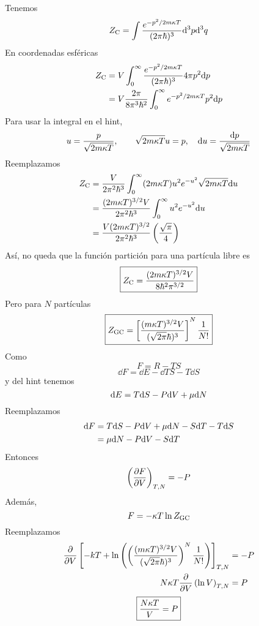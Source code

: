 \begin{sol}
	Tenemos
	\begin{equation}
  Z_{\rm C}=\int\frac{e^{-p^2/2m\kappa T}}{(2\pi\hbar)^3}\dd^3p\dd^3q
\end{equation}
En coordenadas esféricas
\begin{align}
  Z_{\rm C}&=V\int_0^\infty \frac{e^{-p^2/2m\kappa T}}{(2\pi\hbar)^3}4\pi p^2\dd p\\
  &=V\frac{2\pi }{8\pi^3\hbar^2}\int_0^\infty e^{-p^2/2m\kappa T	}p^2\dd p
\end{align}
Para usar la integral en el hint,
\begin{equation}
  u=\frac{p}{\sqrt{2m\kappa T}},\qquad \sqrt{2m\kappa T}u=p, \quad \dd u=\frac{\dd p}{\sqrt{2m\kappa T}}
\end{equation}
Reemplazamos
\begin{align}
  Z_{\rm C}&=\frac{V}{2\pi^2\hbar^3}\int_0^\infty (2m\kappa T)u^2e^{-u^2}\sqrt{2m\kappa T}\dd u\\
  &=\frac{(2m\kappa T)^{3/2}V}{2\pi^2\hbar^3}\int_0^\infty u^2e^{-u^2}\dd u\\
  &=\frac{V(2m\kappa T)^{3/2}}{2\pi^2\hbar^3}\left(\frac{\sqrt{\pi }}{4}\right)
\end{align}
Así, no queda que la función partición para una partícula libre es
\begin{equation}
\boxed{  Z_{\rm C}=\frac{(2m\kappa T)^{3/2}V}{8\hbar^2\pi^{3/2}}}
\end{equation}
Pero para $N$ partículas
\begin{equation}
 \boxed{ Z_{\rm GC}=\left[\frac{(m\kappa T)^{3/2}V}{(\sqrt{2\pi }\hbar )^3}\right]^N\frac{1}{N!}}
\end{equation}
Como 
\begin{equation}
  F=R-TS
\end{equation}
\begin{equation}
  \dd F=\dd E-\dd TS-T\dd S
\end{equation}
y del hint tenemos
\begin{equation}
  \dd E=T\dd S-P\dd V+\mu  \dd N
\end{equation}
Reemplazamos
\begin{align}
  \dd F&=T\dd S-P\dd V+\mu \dd N-S\dd T-T\dd S\\
  &=\mu \dd N-P\dd V-S\dd T
\end{align}
Entonces
\begin{equation}
  \left(\pdv{F}{V} \right)_{T,N}=-P
\end{equation}
Además,
\begin{equation}
  F=-\kappa T\ln Z_{\rm GC}
\end{equation}
Reemplazamos
\begin{align}
  \pdv{V}\left[-k T+\ln \left(\left(\frac{(m\kappa T)^{3/2}V}{(\sqrt{2\pi }\hbar)^3}\right)^N\frac{1}{N!}\right)\right]_{T,N}&=-P\\
  N\kappa T\pdv{V}\left(\ln V\right)_{T,N}&=P
\end{align}
\begin{equation}
\boxed{  \frac{N\kappa T}{V}=P}
\end{equation}
\end{sol}

